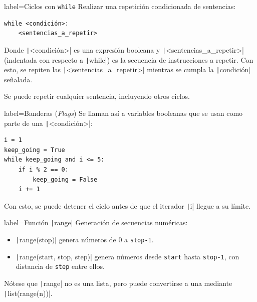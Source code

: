 \begin{contentbox}{label=Ciclos con \texttt{while}}
    Realizar una repetición condicionada de sentencias: 
\begin{verbatim}
while <condición>:
    <sentencias_a_repetir>
\end{verbatim}

    Donde \texttt|<condición>| es una \alert{expresión booleana} y \texttt|<sentencias_a_repetir>| (indentada con respecto a \texttt|while|) es la secuencia de instrucciones a repetir. Con esto, se repiten las \texttt|<sentencias_a_repetir>| mientras se cumpla la \texttt|condición| señalada.
    
    
    Se puede repetir cualquier sentencia, incluyendo otros ciclos.
\end{contentbox}

\begin{contentbox}{label=Banderas (\textit{Flags})}
    Se llaman así a variables booleanas que se usan como parte de una \texttt|<condición>|:
\begin{verbatim}
i = 1
keep_going = True
while keep_going and i <= 5:
    if i % 2 == 0:
        keep_going = False
    i += 1
\end{verbatim}

    Con esto, se puede detener el ciclo antes de que el iterador \texttt|i| llegue a su límite.
\end{contentbox}

\begin{contentbox}{label=Función \texttt|range|}
    Generación de secuencias numéricas:
    \begin{itemize}
        \item \texttt|range(stop)| genera números de 0 a \texttt{stop-1}.
        \item \texttt|range(start, stop, step)| genera números desde \texttt{start} hasta \texttt{stop-1}, con distancia de \texttt{step} entre ellos.
    \end{itemize}
    
    Nótese que \texttt|range| no es una lista, pero puede convertirse a una mediante \texttt|list(range(n))|.
\end{contentbox}

